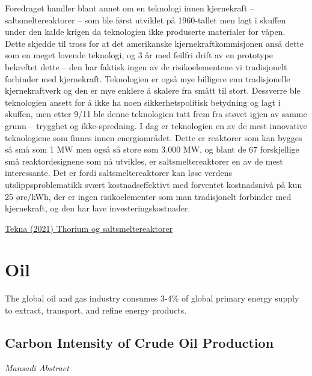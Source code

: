 \documentclass[
]{book}
\begin{document}
Foredraget handler blant annet om en teknologi innen kjernekraft -- saltsmeltereaktorer -- som ble først utviklet på 1960-tallet men lagt i skuffen under den kalde krigen da teknologien ikke produserte materialer for våpen. Dette skjedde til tross for at det amerikanske kjernekraftkommisjonen anså dette som en meget lovende teknologi, og 3 år med feilfri drift av en prototype bekreftet dette -- den har faktisk ingen av de risikoelementene vi tradisjonelt forbinder med kjernekraft. Teknologien er også mye billigere enn tradisjonelle kjernekraftverk og den er mye enklere å skalere fra smått til stort. Dessverre ble teknologien ansett for å ikke ha noen sikkerhetspolitisk betydning og lagt i skuffen, men etter 9/11 ble denne teknologien tatt frem fra støvet igjen av samme grunn -- trygghet og ikke-spredning. I dag er teknologien en av de mest innovative teknologiene som finnes innen energiområdet. Dette er reaktorer som kan bygges så små som 1 MW men også så store som 3.000 MW, og blant de 67 forskjellige små reaktordesignene som nå utvikles, er saltsmeltereaktorer en av de mest interessante. Det er fordi saltsmeltereaktorer kan løse verdens utslippsproblematikk svært kostnadseffektivt med forventet kostnadsnivå på kun 25 øre/kWh, der er ingen risikoelementer som man tradisjonelt forbinder med kjernekraft, og den har lave investeringskostnader.

\href{https://www.tekna.no/fag-og-nettverk/energi/energibloggen/thorium-og-saltsmeltereaktorer/}{Tekna (2021) Thorium og saltsmeltereaktorer}

\hypertarget{oil}{%
\chapter{Oil}\label{oil}}

The global oil and gas industry consumes 3-4\% of global primary energy supply to extract,
transport, and refine energy products.

\hypertarget{carbon-intensity-of-crude-oil-production}{%
\section{Carbon Intensity of Crude Oil Production}\label{carbon-intensity-of-crude-oil-production}}

\emph{Mansadi Abstract}
\end{document}

